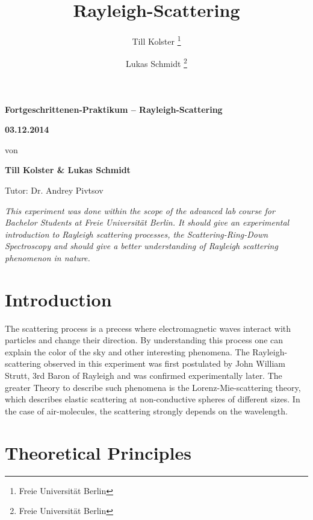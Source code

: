 \documentclass[
	parskip=half,10pt,
	numbers= noenddot, %
	toc=flat, %
	oneside,
	twocolumn,
	]{scrartcl}
\title {Rayleigh-Scattering}
\author {Till Kolster \thanks{Freie Universität Berlin} \and Lukas Schmidt \thanks{Freie Universität Berlin}}
\begin{document}
\begin{titlepage}

\vspace*{-2cm}

\vspace{6cm}
\begin{center}
\huge \bfseries
Fortgeschrittenen-Praktikum -- Rayleigh-Scattering

\vspace{0.5cm}
\large \bfseries
03.12.2014

\vspace{1.5cm}

\large\normalfont von

\bigskip
\textbf{Till Kolster \& Lukas Schmidt}

\bigskip
Tutor: Dr. Andrey Pivtsov

\vspace{3cm}

\parbox{0.8\linewidth}{%
\textit{This experiment was done within the scope of the advanced lab course for Bachelor Students at Freie Universität Berlin.
It should give an experimental introduction to Rayleigh scattering processes, the Scattering-Ring-Down Spectroscopy and should
give a better understanding of Rayleigh scattering phenomenon in nature.
}}


\end{center}
\end{titlepage}

\section{Introduction}

The scattering process is a precess where electromagnetic waves interact with particles and change their direction. By understanding this process one can 
explain the color of the sky and other interesting phenomena. The Rayleigh-scattering observed in this experiment was first postulated by John William Strutt, 3rd 
Baron of Rayleigh and was confirmed experimentally later. The greater Theory to describe such phenomena is the Lorenz-Mie-scattering theory, which 
describes elastic scattering at non-conductive spheres of different sizes. In the case of air-molecules, the scattering strongly depends on the wavelength. 


\section{Theoretical Principles}
\end{document}
